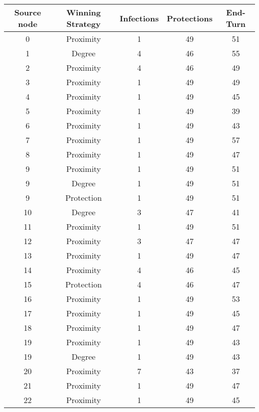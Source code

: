 \documentclass[results.tex]{subfiles}
\begin{document}
\begin{center}
  \begin{tabular}{| c || c | c | c | c |}
    \hline
    {\bfseries Source node} & {\bfseries Winning Strategy} & {\bfseries Infections} & {\bfseries Protections} & {\bfseries End-Turn} \\  %
    \hline\hline
    0 & Proximity & 1 & 49 & 51 \\ 
    \hline
    1 & Degree & 4 & 46 & 55 \\ 
    \hline
    2 & Proximity & 4 & 46 & 49 \\ 
    \hline
    3 & Proximity & 1 & 49 & 49 \\ 
    \hline
    4 & Proximity & 1 & 49 & 45 \\ 
    \hline
    5 & Proximity & 1 & 49 & 39 \\ 
    \hline
    6 & Proximity & 1 & 49 & 43 \\ 
    \hline
    7 & Proximity & 1 & 49 & 57 \\ 
    \hline
    8 & Proximity & 1 & 49 & 47 \\ 
    \hline
    9 & Proximity & 1 & 49 & 51 \\ 
    \hline
    9 & Degree & 1 & 49 & 51 \\ 
    \hline
    9 & Protection & 1 & 49 & 51 \\ 
    \hline
    10 & Degree & 3 & 47 & 41 \\ 
    \hline
    11 & Proximity & 1 & 49 & 51 \\ 
    \hline
    12 & Proximity & 3 & 47 & 47 \\ 
    \hline
    13 & Proximity & 1 & 49 & 47 \\ 
    \hline
    14 & Proximity & 4 & 46 & 45 \\ 
    \hline
    15 & Protection & 4 & 46 & 47 \\ 
    \hline
    16 & Proximity & 1 & 49 & 53 \\ 
    \hline
    17 & Proximity & 1 & 49 & 45 \\ 
    \hline
    18 & Proximity & 1 & 49 & 47 \\ 
    \hline
    19 & Proximity & 1 & 49 & 43 \\ 
    \hline
    19 & Degree & 1 & 49 & 43 \\ 
    \hline
    20 & Proximity & 7 & 43 & 37 \\ 
    \hline
    21 & Proximity & 1 & 49 & 47 \\ 
    \hline
    22 & Proximity & 1 & 49 & 45 \\ 

\end{tabular}
\end{center}
\end{document}
